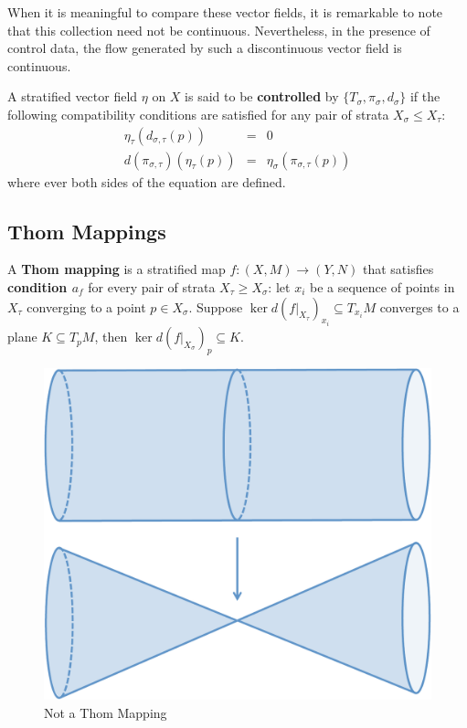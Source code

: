 When it is meaningful to compare these vector fields, it is remarkable to note that this collection need not be continuous. Nevertheless, in the presence of control data, the flow generated by such a discontinuous vector field is continuous.

\begin{defn}
A stratified vector field $\eta$ on $X$ is said to be \textbf{controlled} by $\{T_{\sigma},\pi_{\sigma},d_{\sigma}\}$ if the following compatibility conditions are satisfied for any pair of strata $X_{\sigma}\leq X_{\tau}$:
\begin{eqnarray*}
 \eta_{\tau}(d_{\sigma,\tau}(p)) & = & 0 \\
 d(\pi_{\sigma,\tau})(\eta_{\tau}(p)) & = & \eta_{\sigma}(\pi_{\sigma,\tau}(p)) 
\end{eqnarray*}
where ever both sides of the equation are defined.
\end{defn}

\subsection{Thom Mappings}

\begin{defn}
	A \textbf{Thom mapping} is a stratified map $f:(X,M)\to (Y,N)$ that satisfies \textbf{condition $a_f$} for every pair of strata $X_{\tau}\geq X_{\sigma}$: let $x_i$ be a sequence of points in $X_{\tau}$ converging to a point $p\in X_{\sigma}$. Suppose $\ker d(f|_{X_{\tau}})_{x_i}\subseteq T_{x_i} M$ converges to a plane $K\subseteq T_{p} M$, then $\ker d(f|_{X_{\sigma}})_p\subseteq K$. 
\end{defn}

\begin{figure}
	\centering
	\includegraphics[width=.8\textwidth]{not_thom.pdf}
	\caption{Not a Thom Mapping}
	\label{fig:not_thom}
\end{figure}


